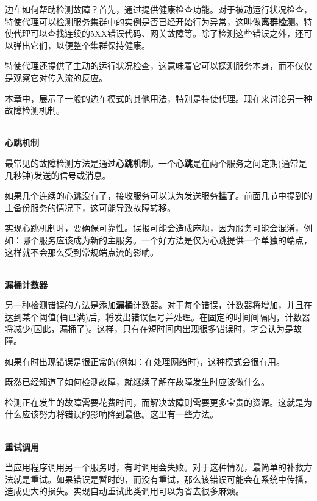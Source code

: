 边车如何帮助检测故障？首先，通过提供健康检查功能。对于被动运行状况检查，特使代理可以检测服务集群中的实例是否已经开始行为异常，这叫做\textbf{离群检测}。特使代理可以查找连续的5XX错误代码、网关故障等。除了检测这些错误之外，还可以弹出它们，以便整个集群保持健康。

特使代理还提供了主动的运行状况检查，这意味着它可以探测服务本身，而不仅仅是观察它对传入流的反应。

本章中，展示了一般的边车模式的其他用法，特别是特使代理。现在来讨论另一种故障检测机制。

\hspace*{\fill} \\ %
\noindent
\textbf{心跳机制}

最常见的故障检测方法是通过\textbf{心跳机制}。一个\textbf{心跳}是在两个服务之间定期(通常是几秒钟)发送的信号或消息。

如果几个连续的心跳没有了，接收服务可以认为发送服务\textbf{挂了}。前面几节中提到的主备份服务的情况下，这可能导致故障转移。

实现心跳机制时，要确保可靠性。误报可能会造成麻烦，因为服务可能会混淆，例如：哪个服务应该成为新的主服务。一个好方法是仅为心跳提供一个单独的端点，这样就不会那么受到常规端点流的影响。

\hspace*{\fill} \\ %
\noindent
\textbf{漏桶计数器}

另一种检测错误的方法是添加\textbf{漏桶}计数器。对于每个错误，计数器将增加，并且在达到某个阈值(桶已满)后，将发出错误信号并处理。在固定的时间间隔内，计数器将减少(因此，漏桶了)。这样，只有在短时间内出现很多错误时，才会认为是故障。

如果有时出现错误是很正常的(例如：在处理网络时)，这种模式会很有用。

既然已经知道了如何检测故障，就继续了解在故障发生时应该做什么。


检测正在发生的故障需要花费时间，而解决故障则需要更多宝贵的资源。这就是为什么应该努力将错误的影响降到最低。这里有一些方法。

\hspace*{\fill} \\ %
\noindent
\textbf{重试调用}

当应用程序调用另一个服务时，有时调用会失败。对于这种情况，最简单的补救方法就是重试。如果错误是暂时的，而没有重试，那么该错误可能会在系统中传播，造成更大的损失。实现自动重试此类调用可以为省去很多麻烦。

